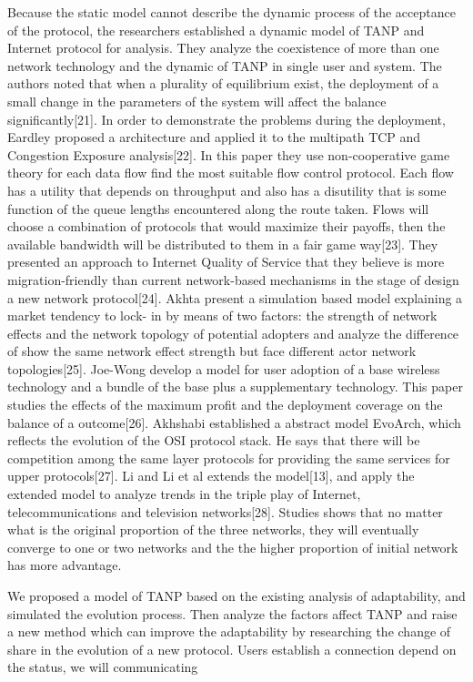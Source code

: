 \documentclass{article}
\begin{document}
Because the static model cannot describe the dynamic process of the acceptance of the protocol, the researchers established a dynamic model of TANP and Internet protocol for analysis. They analyze the coexistence of more than one network technology and the dynamic of TANP in single user and system. The authors noted that when a plurality of equilibrium exist, the deployment of a small change in the parameters of the system will affect the balance significantly[21]. In order to demonstrate the problems during the deployment, Eardley proposed a architecture and applied it to the multipath TCP and Congestion Exposure analysis[22]. In this paper they use non-cooperative game theory for each data flow find the most suitable flow control protocol.  Each flow has a utility that depends on throughput and also has a disutility that is some function of the queue lengths encountered along the route taken. Flows will choose a combination of protocols that would maximize their payoffs, then the available bandwidth will be distributed to them in a fair game way[23]. They presented an approach to Internet Quality of Service that they believe is more migration-friendly than current network-based mechanisms in the stage of design a new network protocol[24]. Akhta present a simulation based model explaining a market tendency to lock- in by means of two factors: the strength of network effects and the network topology of potential adopters and analyze the difference of show the same network effect strength but face different actor network topologies[25]. Joe-Wong develop a model for user adoption of a base wireless technology and a bundle of the base plus a supplementary technology. This paper studies the effects of the maximum profit and the deployment coverage on the balance of a outcome[26]. Akhshabi established a abstract model EvoArch, which reflects the evolution of the OSI protocol stack. He says that there will be competition among the same layer protocols for providing the same services for upper protocols[27]. Li and Li et al extends the model[13], and apply the extended model to analyze trends in the triple play of Internet, telecommunications and television networks[28]. Studies shows that no matter what is the original proportion of the three networks, they will eventually converge to one or two networks and the the higher proportion of initial network  has more advantage. 

We proposed a model of TANP based on the existing analysis of adaptability, and simulated the evolution process. Then analyze the factors affect TANP and raise a new method which can improve the adaptability by researching the change of share in the evolution of a new protocol. Users establish a connection depend on the status, we will communicating
\end{document}
